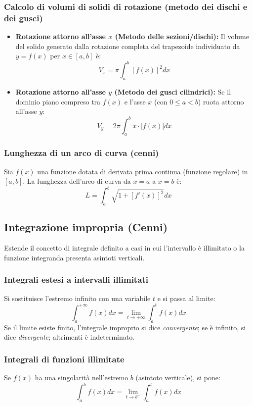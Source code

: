 \subsubsection{Calcolo di volumi di solidi di rotazione (metodo dei dischi e dei gusci)}
\begin{itemize}
    \item \textbf{Rotazione attorno all'asse $x$ (Metodo delle sezioni/dischi):} Il volume del solido generato dalla rotazione completa del trapezoide individuato da $y=f(x)$ per $x \in [a,b]$ è:
    \[ V_x = \pi \int_a^b [f(x)]^2 dx \]
    \item \textbf{Rotazione attorno all'asse $y$ (Metodo dei gusci cilindrici):} Se il dominio piano compreso tra $f(x)$ e l'asse $x$ (con $0 \le a < b$) ruota attorno all'asse $y$:
    \[ V_y = 2\pi \int_a^b x \cdot |f(x)| dx \]
\end{itemize}

\subsubsection{Lunghezza di un arco di curva (cenni)}
Sia $f(x)$ una funzione dotata di derivata prima continua (funzione regolare) in $[a,b]$. La lunghezza dell'arco di curva da $x=a$ a $x=b$ è:
\[ L = \int_a^b \sqrt{1 + [f'(x)]^2} dx \]

\subsection{Integrazione impropria (Cenni)}
Estende il concetto di integrale definito a casi in cui l'intervallo è illimitato o la funzione integranda presenta asintoti verticali.
\subsubsection{Integrali estesi a intervalli illimitati}
Si sostituisce l'estremo infinito con una variabile $t$ e si passa al limite:
\[ \int_a^{+\infty} f(x) dx = \lim_{t \to +\infty} \int_a^t f(x) dx \]
Se il limite esiste finito, l'integrale improprio si dice \textit{convergente}; se è infinito, si dice \textit{divergente}; altrimenti è indeterminato.

\subsubsection{Integrali di funzioni illimitate}
Se $f(x)$ ha una singolarità nell'estremo $b$ (asintoto verticale), si pone:
\[ \int_a^b f(x) dx = \lim_{t \to b^-} \int_a^t f(x) dx \]

